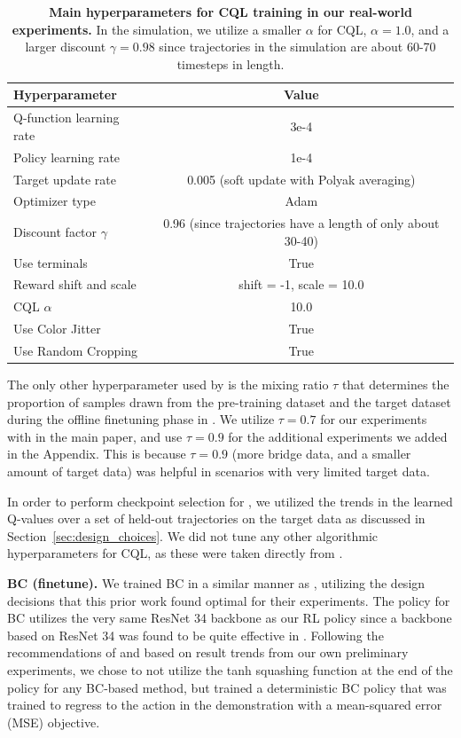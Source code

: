 \documentclass[conference]{IEEEtran}
\begin{document}
\begin{table}[h]
\centering
\begin{tabular}{l|c}
\toprule
\textbf{Hyperparameter} & \textbf{Value}\\  \midrule
Q-function learning rate & 3e-4 \\
Policy learning rate & 1e-4 \\
Target update rate & 0.005 (soft update with Polyak averaging) \\
Optimizer type & Adam \\
Discount factor $\gamma$ & 0.96 (since trajectories have a length of only about 30-40) \\
Use terminals & True \\
Reward shift and scale & shift = -1, scale = 10.0 \\
CQL $\alpha$ & 10.0 \\
Use Color Jitter & True \\
Use Random Cropping & True \\
\bottomrule
\end{tabular}
\vspace{0.07cm}
\caption{\footnotesize{\textbf{Main hyperparameters for CQL training in our real-world experiments.} In the simulation, we utilize a smaller $\alpha$ for CQL, $\alpha=1.0$, and a larger discount $\gamma = 0.98$ since trajectories in the simulation are about 60-70 timesteps in length. }}
\label{tab:hparams_cql}
\end{table}

The only other hyperparameter used by \methodname is the mixing ratio $\tau$ that determines the proportion of samples drawn from the pre-training dataset and the target dataset during the offline finetuning phase in \methodname. We utilize $\tau = 0.7$ for our experiments with \methodname in the main paper, and use $\tau = 0.9$ for the additional experiments we added in the Appendix. This is because $\tau=0.9$ (more bridge data, and a smaller amount of target data) was helpful in scenarios with very limited target data.  

In order to perform checkpoint selection for \methodname, we utilized the trends in the learned Q-values over a set of held-out trajectories on the target data as discussed in Section~\ref{sec:design_choices}. We did not tune any other algorithmic hyperparameters for CQL, as these were taken directly from \citep{singh2020cog}.  

\textbf{BC (finetune).}
We trained BC in a similar manner as \citet{ebert2021bridge}, utilizing the design decisions that this prior work found optimal for their experiments. The policy for BC utilizes the very same ResNet 34 backbone as our RL policy since a backbone based on ResNet 34 was found to be quite effective in \citet{ebert2021bridge}. Following the recommendations of \citet{ebert2021bridge} and based on result trends from our own preliminary experiments, we chose to not utilize the tanh squashing function at the end of the policy for any BC-based method, but trained a deterministic BC policy that was trained to regress to the action in the demonstration with a mean-squared error (MSE) objective. 
\end{document}
